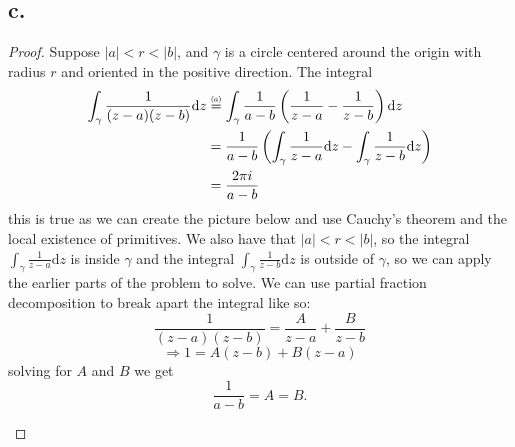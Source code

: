 \documentclass{article}
\newcommand\numeq[1]%
  {\stackrel{\scriptscriptstyle(\mkern-1.5mu#1\mkern-1.5mu)}{=}}
\begin{document}
\subsection*{c.}
\begin{proof}
  Suppose $|a| < r < |b|$, and $\gamma$ is a circle centered around the origin with radius $r$ and oriented in the positive direction. The integral 
  \begin{align*}
    \int_{\gamma}\frac{1}{(z - a)(z - b)} \mathrm{d}z &\numeq{a}\int_{\gamma}\frac{1}{a - b} \left(\frac{1}{z - a} - \frac{1}{z - b} \right) \mathrm{d}z \\
    &= \frac{1}{a - b}\left(\int_{\gamma}\frac{1}{z - a} \mathrm{d}z - \int_{\gamma}\frac{1}{z-b} \mathrm{d}z \right) \\
    &= \frac{2 \pi i}{a - b}
  \end{align*}
  this is true as we can create the picture below and use Cauchy's theorem and the local existence of primitives. We also have that $|a| < r < |b|$, so the integral $\int_{\gamma}\frac{1}{z - a} \mathrm{d}z$ is inside $\gamma$ and the integral $\int_{\gamma}\frac{1}{z - b} \mathrm{d}z$ is outside of $\gamma$, so we can apply the earlier parts of the problem to solve. We can use partial fraction decomposition to break apart the integral like so:
  \[
    \frac{1}{(z - a)(z - b)} = \frac{A}{z - a} + \frac{B}{z - b}  
    \]
    \[
    \Rightarrow 1 = A(z - b) + B(z - a)  
    \]
    solving for $A$ and $B$ we get
    \[
    \frac{1}{a - b} = A = B.  
    \]
  \begin{center}
    
    \begin{tikzpicture}[x=0.5pt,y=0.5pt,yscale=-1,xscale=1]
    

\end{tikzpicture}
\end{center}
\end{proof}
\end{document}
